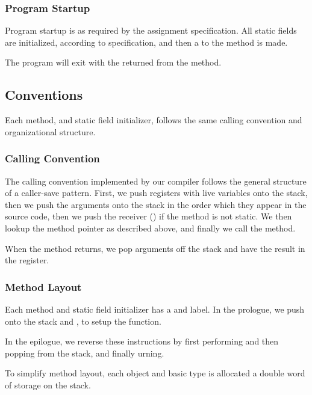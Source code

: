 \documentclass[pdftex,11pt,a4paper]{article}
\begin{document}
\subsubsection{Program Startup}

Program startup is as required by the assignment specification. All
static fields are initialized, according to specification, and then a
 to the  method is made.

The program will exit with the  returned from the
 method.

\subsection{Conventions}

Each method, and static field initializer, follows the same calling
convention and organizational structure.

\subsubsection{Calling Convention}

The calling convention implemented by our compiler follows the general
structure of a caller-save pattern. First, we push registers with live
variables onto the stack, then we push the arguments onto the stack in
the order which they appear in the source code, then we push the
receiver () if the method is not static. We then lookup the
method pointer as described above, and finally we call the method.

When the method returns, we pop arguments off the stack and have the
result in the  register.

\subsubsection{Method Layout}

Each method and static field initializer has a  and
 label. In the prologue, we push  onto the
stack and , to setup the function.

In the epilogue, we reverse these instructions by first performing
 and then popping  from the stack, and
finally urning.

To simplify method layout, each object and basic type is allocated a
double word of storage on the stack.
\end{document}
